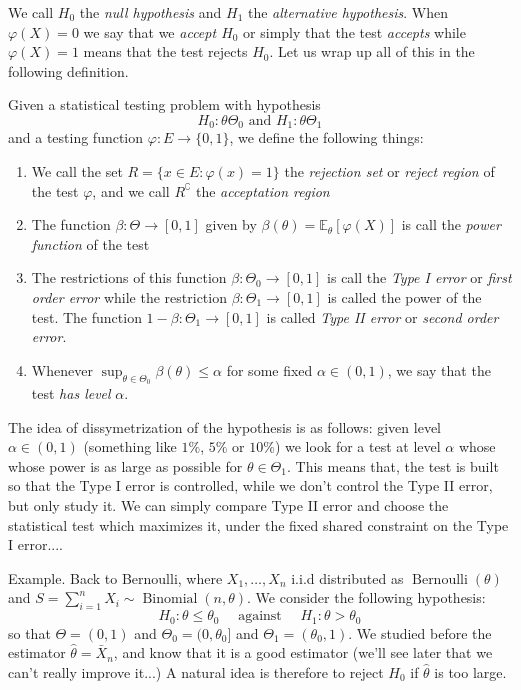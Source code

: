 \documentclass[
	fontsize=11pt, %
	twoside=false, %
	numbers=noenddot, %
]{kaobook}
\DeclareMathOperator{\ber}{Bernoulli}
\DeclareMathOperator{\bin}{Binomial}
\newcommand{\E}{\mathbb E}
\newcommand{\wh}{\widehat}
\newcommand{\goes}{\rightarrow}
\begin{document}
We call $H_0$ the \emph{null hypothesis} and $H_1$ the \emph{alternative hypothesis}.
When $\varphi(X) = 0$ we say that we \emph{accept $H_0$} or simply that the test \emph{accepts} while $\varphi(X) = 1$ means that the test rejects $H_0$.
Let us wrap up all of this in the following definition.
\begin{definition}
	Given a statistical testing problem with hypothesis
	\begin{equation*}
		H_0 : \theta \Theta_0 \text{ and } H_1 : \theta \Theta_1
	\end{equation*}
	and a testing function $\varphi : E \goes \{ 0, 1 \}$, we define the following things:
	\begin{enumerate}
		\item We call the set $R = \{ x \in E : \varphi(x) = 1 \}$ the \emph{rejection set} or \emph{reject region} of the test $\varphi$, and we call $R^\complement$ the \emph{acceptation region}
		\item The function $\beta : \Theta \goes [0, 1]$ given by $\beta(\theta) = \E_\theta [\varphi(X)]$ is call the \emph{power function} of the test
		\item The restrictions of this function $\beta : \Theta_0 \goes [0, 1]$ is call the \emph{Type I error} or \emph{first order error} while the restriction $\beta : \Theta_1 \goes [0, 1]$ is called the power of the test. The function $1 - \beta : \Theta_1 \goes [0, 1]$ is called \emph{Type II error} or \emph{second order error}.
		\item Whenever $\sup_{\theta \in \Theta_0} \beta(\theta) \leq \alpha$ for some fixed $\alpha \in (0, 1)$, we say that the test \emph{has level} $\alpha$.
	\end{enumerate}
\end{definition}


The idea of dissymetrization of the hypothesis is as follows: given level $\alpha \in (0, 1)$ (something like $1\%$, $5\%$ or $10\%$) we look for a test at level $\alpha$ whose whose power is as large as possible for $\theta \in \Theta_1$.
This means that, the test is built so that the Type I error is controlled, while we don't control the Type II error, but only study it.
We can simply compare Type II error and choose the statistical test which maximizes it, under the fixed shared constraint on the Type I error....

Example. Back to Bernoulli, where $X_1, \ldots, X_n$ i.i.d distributed as $\ber(\theta)$ and $S = \sum_{i=1}^n X_i \sim \bin(n, \theta)$.
We consider the following hypothesis:
\begin{equation*}
	H_0 : \theta \leq \theta_0 \quad \text{ against } \quad H_1 : \theta > \theta_0
\end{equation*}
so that $\Theta = (0, 1)$ and $\Theta_0 = (0, \theta_0]$ and $\Theta_1 = (\theta_0, 1)$.
We studied before the estimator $\wh \theta = \bar X_n$, and know that it is a good estimator (we'll see later that we can't really improve it...)
A natural idea is therefore to reject $H_0$ if $\wh \theta$ is too large.
\end{document}
